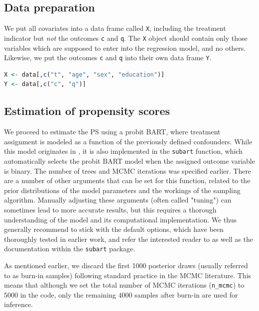 \documentclass[aoas,preprint]{imsart}
\theoremstyle{plain}
\theoremstyle{definition}
\theoremstyle{remark}
\theoremstyle{remark}
\begin{document}
\subsection{Data preparation}
We put all covariates into a data frame called \texttt{X}, including the treatment indicator but \emph{not} the outcomes \texttt{c} and \texttt{q}. The \texttt{X} object should contain only those variables which are supposed to enter into the regression model, and no others.
Likewise, we put the outcomes \texttt{c} and \texttt{q} into their own data frame \texttt{Y}.

\begin{lstlisting}[language=R, caption={Construction of covariate data frame \texttt{X} and outcome data frame \texttt{Y} by selecting relevant covariates and response variables}]
X <- data[,c("t", "age", "sex", "education")]
Y <- data[,c("c", "q")]
\end{lstlisting}
\subsection{Estimation of propensity scores}\label{sec:PS}
We proceed to estimate the PS using a probit BART, where treatment assignment is modeled as a function of the previously defined confounders. While this model originates in \citet{chipman2010bart}, it is also implemented in the \texttt{subart} function, which automatically selects the probit BART model when the assigned outcome variable is binary. The number of trees and MCMC iterations was specified earlier. There are a number of other arguments that can be set for this function, related to the prior distributions of the model parameters and the workings of the sampling algorithm. Manually adjusting these arguments (often called "tuning") can sometimes lead to more accurate results, but this requires a thorough understanding of the model and its computational implementation. We thus generally recommend to stick with the default options, which have been thoroughly tested in earlier work, and refer the interested reader to \citet{chipman2010bart,esser2025seemingly} as well as the documentation within the \texttt{subart} package.

As mentioned earlier, we discard the first 1000 posterior draws (usually referred to as burn-in samples) following standard practice in the MCMC literature. This means that although we set the total number of MCMC iterations (\texttt{n\_mcmc}) to $5000$ in the code, only the remaining $4000$ samples after burn-in are used for inference.
\end{document}
